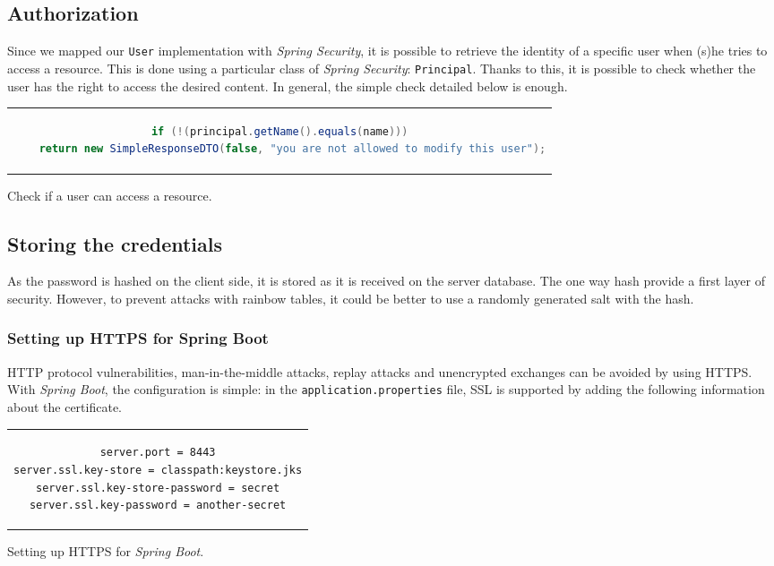 \documentclass[a4paper, oneside, 11pt]{book}
\begin{document}
\subsection{Authorization}
Since we mapped our \texttt{User} implementation with \textit{Spring Security}, it is possible to retrieve the identity of a specific user when (s)he tries to access a resource. This is done using a particular class of \textit{Spring Security}: \texttt{Principal}. Thanks to this, it is possible to check whether the user has the right to access the desired content. In general, the simple check detailed below is enough.
\begin{listing}[!h]
	\centering
	\begin{tabular}{c}
		\begin{lstlisting}[language=java]        
if (!(principal.getName().equals(name)))
    return new SimpleResponseDTO(false, "you are not allowed to modify this user");
		\end{lstlisting}   
	\end{tabular}
	\caption{Check if a user can access a resource.}
	\label{lst:authorization}
\end{listing}		         

\subsection{Storing the credentials}
As the password is hashed on the client side, it is stored as it is received on the server database. The one way hash provide a first layer of security. However, to prevent attacks with rainbow tables, it could be better to use a randomly generated salt with the hash.

\subsubsection{Setting up HTTPS for Spring Boot}
HTTP protocol vulnerabilities, man-in-the-middle attacks, replay attacks and unencrypted exchanges can be avoided by using HTTPS. With \textit{Spring Boot}, the configuration is simple: in the \texttt{application.properties} file, SSL is supported by adding the following information about the certificate.\\

\begin{listing}[!h]
	\centering
	\begin{tabular}{c}
		\begin{lstlisting}[breaklines]
server.port = 8443
server.ssl.key-store = classpath:keystore.jks
server.ssl.key-store-password = secret
server.ssl.key-password = another-secret
		\end{lstlisting}
	\end{tabular}
	\caption{Setting up HTTPS for \textit{Spring Boot}.}
	\label{lst:https}
\end{listing}
\end{document}
